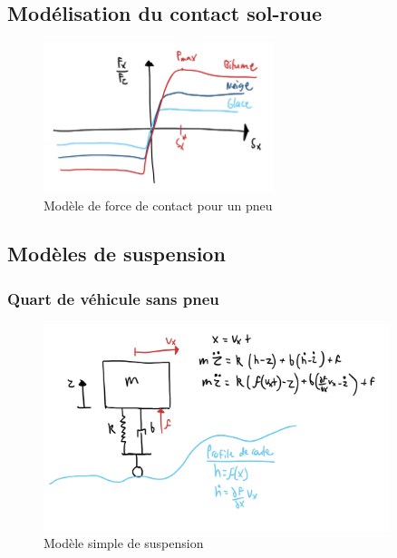 \subsection{Modélisation du contact sol-roue}

\begin{figure}[htbp]
	\centering
		\includegraphics[width=0.60\textwidth]{fig/slipcurve.jpg}
	\caption{Modèle de force de contact pour un pneu}
	\label{fig:slipcurve}
\end{figure}





\subsection{Modèles de suspension}

\subsubsection{Quart de véhicule sans pneu}

\begin{figure}[htbp]
	\centering
		\includegraphics[width=0.90\textwidth]{fig/simplesuspension.jpg}
	\caption{Modèle simple de suspension}
	\label{fig:simplesuspension}
\end{figure}

